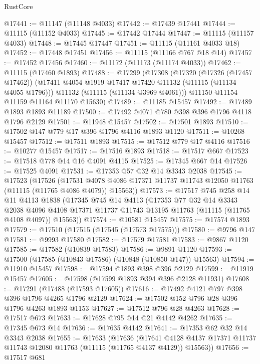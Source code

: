 \begin{lexlean}{RustCore}
\begin{coremodule}
@17441 := @11147 (@11148 @4033)
@17442 := @17439 @17441
@17444 := @11115 (@11152 @4033)
@17445 := @17442 @17444
@17447 := @11115 (@11157 @4033)
@17448 := @17445 @17447
@17451 := @11115 (@11161 @4033 @18)
@17452 := @17448 @17451
@17456 := @11115 (@11166 @767 @18 @14)
@17457 := @17452 @17456
@17460 := @11172 (@11173 (@11174 @4033))
@17462 := @11115 (@17460 @1893)
@17488 := @17299
    (@17308
      (@17320
        (@17326 (@17457 @17462))
        (@17411 @4054 @1919 @17417 @17420 @11132 (@11115 (@11134 @4055 @1796)))
        @11132
        (@11115 (@11134 @3969 @4061)))
      @11150
      @11154
      @11159
      @11164
      @11170
      @15630)
@17489 := @11185 @15457
@17492 := @17489 @1893 @1893 @11189
@17500 := @17492 @4071 @780 @398 @396 @1796 @4118 @1796 @2129
@17501 := @11948 @15457
@17502 := @17501 @1893
@17510 := @17502 @147 @779 @17 @396 @1796 @4116 @1893 @1120
@17511 := @10268 @15457
@17512 := @17511 @1893
@17515 := @17512 @779 @17 @4116
@17516 := @10277 @15457
@17517 := @17516 @1893
@17518 := @17517 @667
@17523 := @17518 @778 @14 @16 @4091 @4115
@17525 := @17345 @667 @14
@17526 := @17525 @4091
@17531 := @17353 @57 @32 @14 @3343 @2038
@17545 := @17523
    (@17526
      (@17531 @4078 @4086 @17371 @11737 @11743 @12050 @11763 (@11115 (@11765 @4086 @4079)) @15563))
@17573 := @17517
    @745
    @258
    @14
    @11
    @4113
    @1838
    (@17345
      @745
      @14
      @4113
      (@17353
        @77
        @32
        @14
        @3343
        @2038
        @4096
        @4108
        @17371
        @11737
        @11743
        @13195
        @11763
        (@11115 (@11765 @4108 @4097))
        @15563))
@17574 := @10581 @15457
@17575 := @17574 @1893
@17579 := @17510 (@17515 (@17545 (@17573 @17575)))
@17580 := @9796 @147
@17581 := @9993 @17580
@17582 := @17579 @17581
@17583 := @9867 @1120
@17585 := @17582 (@10839 @17583)
@17586 := @9891 @1120
@17593 := @17500 (@17585 (@10843 @17586) (@10848 (@10850 @147)) @15563)
@17594 := @11910 @15457
@17598 := @17594 @1893 @398 @396 @2129
@17599 := @11919 @15457
@17605 := @17598 (@17599 @1893 @394 @396 @2128 @11931)
@17608 := @17291 (@17488 (@17593 @17605))
@17616 := @17492 @4121 @797 @398 @396 @1796 @4265 @1796 @2129
@17624 := @17502 @152 @796 @28 @396 @1796 @4263 @1893 @1153
@17627 := @17512 @796 @28 @4263
@17628 := @17517 @673
@17633 := @17628 @795 @14 @21 @4142 @4262
@17635 := @17345 @673 @14
@17636 := @17635 @4142
@17641 := @17353 @62 @32 @14 @3343 @2038
@17655 := @17633
    (@17636
      (@17641 @4128 @4137 @17371 @11737 @11743 @12080 @11763 (@11115 (@11765 @4137 @4129)) @15563))
@17656 := @17517 @681

\end{coremodule}
\end{lexlean}
